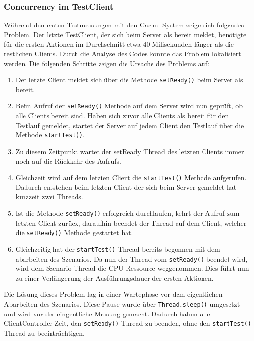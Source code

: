 \subsubsection{Concurrency im TestClient}
\label{sec:concurrencyTestClient}
Während den ersten Testmessungen mit den Cache- System zeige sich folgendes Problem. Der letzte TestClient, der sich beim Server als bereit meldet, benötigte für die ersten Aktionen im Durchschnitt etwa 40 Milisekunden länger als die restlichen Clients. Durch die Analyse des Codes konnte das Problem lokalisiert werden. Die folgenden Schritte zeigen die Ursache des Problems auf:
\begin{enumerate}
\item Der letzte Client meldet sich über die Methode \verb+setReady()+ beim Server als bereit. 
\item Beim Aufruf der \verb+setReady()+ Methode auf dem Server wird nun ge\-prüft, ob alle Clients bereit sind. Haben sich zuvor alle Clients als bereit für den Test\-lauf ge\-meldet, startet der Server auf jedem Client den Testlauf über die Methode \verb+startTest()+.
\item Zu diesem Zeitpunkt wartet der setReady Thread des letzten Clients immer noch auf die Rückkehr des Aufrufs.
\item Gleich\-zeit wird auf dem letzten Client die \verb+startTest()+ Methode auf\-gerufen. Da\-durch ent\-stehen beim letzten Client der sich beim Server gemeldet hat kurz\-zeit zwei Threads.
\item Ist die Methode \verb+setReady()+ erfolg\-reich durch\-laufen, kehrt der Auf\-ruf zum letzten Client zu\-rück, da\-rauf\-hin be\-endet der Thread auf dem Client, welcher die \verb+setReady()+ Methode ge\-startet hat.
\item Gleichzeitig hat der \verb+startTest()+ Thread bereits begonnen mit dem abarbeiten des Szenarios. Da nun der Thread vom \verb+setReady()+ beendet wird, wird dem Szenario Thread die CPU-Ressource weggenommen. Dies führt nun zu einer Verlängerung der Ausführungsdauer der ersten Aktionen.
\end{enumerate}
Die Lösung dieses Problem lag in einer Wartephase vor dem eigentlichen Abarbeiten des Szenarios. Diese Pause wurde über \verb+Thread.sleep()+ um\-ge\-setzt und wird vor der eingent\-liche Messung ge\-macht. Da\-durch haben alle Client\-Controller Zeit, den \verb+setReady()+ Th\-read zu be\-enden, ohne den \verb+startTest()+ Th\-read zu be\-ein\-träch\-ti\-gen.



